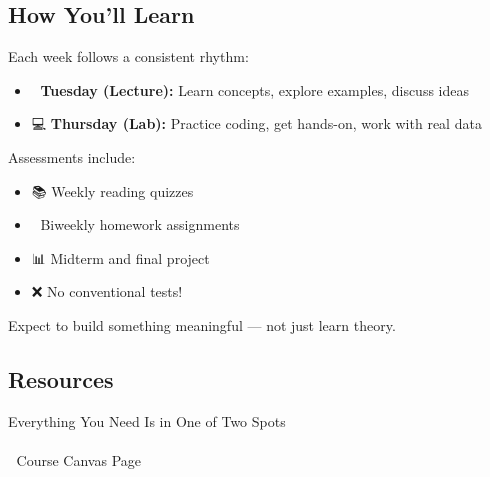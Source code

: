 \documentclass[
  letterpaper,
  DIV=11,
  numbers=noendperiod]{scrartcl}
\makeatletter
\let\oldparagraph\paragraph
\renewcommand{\paragraph}{
    \@ifstar
      \xxxParagraphStar
      \xxxParagraphNoStar
  }
\newcommand{\xxxParagraphStar}[1]{\oldparagraph*{#1}\mbox{}}
\newcommand{\xxxParagraphNoStar}[1]{\oldparagraph{#1}\mbox{}}
\providecommand{\tightlist}{%
  \setlength{\itemsep}{0pt}\setlength{\parskip}{0pt}}
\makeatother
\begin{document}
\subsection{How You'll Learn}\label{how-youll-learn}

Each week follows a consistent rhythm:

\begin{itemize}
\tightlist
\item
  🧠 \textbf{Tuesday (Lecture):} Learn concepts, explore examples,
  discuss ideas
\item
  💻 \textbf{Thursday (Lab):} Practice coding, get hands-on, work with
  real data
\end{itemize}

Assessments include:

\begin{itemize}
\tightlist
\item
  📚 Weekly reading quizzes\\
\item
  📝 Biweekly homework assignments\\
\item
  📊 Midterm and final project\\
\item
  ❌ No conventional tests!
\end{itemize}

\begin{tcolorbox}[enhanced jigsaw, colbacktitle=quarto-callout-important-color!10!white, opacityback=0, colback=white, opacitybacktitle=0.6, toptitle=1mm, left=2mm, bottomrule=.15mm, breakable, bottomtitle=1mm, rightrule=.15mm, titlerule=0mm, title=\textcolor{quarto-callout-important-color}{\faExclamation}\hspace{0.5em}{Important}, coltitle=black, colframe=quarto-callout-important-color-frame, arc=.35mm, toprule=.15mm, leftrule=.75mm]

{Expect to build something meaningful --- not just learn theory.}

\end{tcolorbox}

\subsection{Resources}\label{resources}

Everything You Need Is in One of Two Spots

\paragraph{📍 Course Canvas Page}\label{course-canvas-page}
\end{document}
